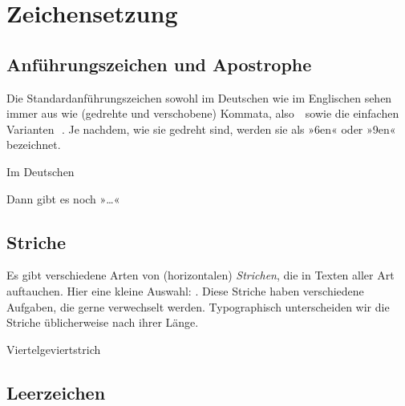 \chapter{Zeichensetzung}

\lipsum[1]

\section{Anführungszeichen und Apostrophe}

Die Standardanführungszeichen sowohl im Deutschen wie im Englischen sehen immer
aus wie (gedrehte und verschobene) Kommata, also \,\,
sowie die einfachen Varianten \,\,. Je nachdem, wie sie
gedreht sind, werden sie als »6en« oder »9en« bezeichnet.

Im Deutschen 

Dann gibt es noch »…«

\section{Striche}

Es gibt verschiedene Arten von (horizontalen) \emph{Strichen}, die in
Texten aller Art auftauchen.  Hier eine kleine Auswahl:
\Char{-\,--\,---\,$-$\,$=$}.  Diese Striche haben verschiedene
Aufgaben, die gerne verwechselt werden.  Typographisch unterscheiden
wir die Striche üblicherweise nach ihrer Länge.

\begin{description}
\item[Viertelgeviertstrich]
\end{description}

\section{Leerzeichen}

